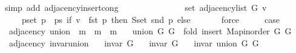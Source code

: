 \begin{isabellebody}
\ {\isacharparenleft}{\kern0pt}simp\ add{\isacharcolon}{\kern0pt}\ adjacency{\isacharunderscore}{\kern0pt}insert{\isacharunderscore}{\kern0pt}{}{\isacharunderscore}{\kern0pt}cong{\isacharparenright}{\kern0pt}\isanewline
\ \ \isamarkupfalse%
\ \isamarkupfalse%
\isanewline
\ \ \ \ {\isachardoublequoteopen}{\isachardot}{\kern0pt}{\isachardot}{\kern0pt}{\isachardot}{\kern0pt}\ {\isacharequal}{\kern0pt}\isanewline
\ \ \ \ \ set\ {\isacharparenleft}{\kern0pt}adjacency{\isacharunderscore}{\kern0pt}list\ G\ v{\isacharparenright}{\kern0pt}\ {\isasymunion}\isanewline
\ \ \ \ \ {\isacharparenleft}{\kern0pt}{\isasymUnion}p{\isasymin}set\ {\isacharparenleft}{\kern0pt}p\ {\isacharhash}{\kern0pt}\ ps{\isacharparenright}{\kern0pt}{\isachardot}{\kern0pt}\ if\ v\ {\isacharequal}{\kern0pt}\ fst\ p\ then\ S{\isachardot}{\kern0pt}set\ {\isacharparenleft}{\kern0pt}snd\ p{\isacharparenright}{\kern0pt}\ else\ {\isacharbraceleft}{\kern0pt}{\isacharbraceright}{\kern0pt}{\isacharparenright}{\kern0pt}{\isachardoublequoteclose}\isanewline
\ \ \ \ \isamarkupfalse%
\ force\isanewline
\ \ \isamarkupfalse%
\ \isamarkupfalse%
\ {\isacharquery}{\kern0pt}case\isanewline
\ \ \ \ \isacommand{{\isachardot}{\kern0pt}}\isamarkupfalse%
\isanewline
{}\isamarkupfalse%
%
\endisatagproof
{\isafoldproof}%
%
\isadelimproof
\isanewline
%
\endisadelimproof
\isanewline
{}\isamarkupfalse%
\ {\isacharparenleft}{\kern0pt}\ adjacency{\isacharparenright}{\kern0pt}\ union\ {\isacharcolon}{\kern0pt}{\isacharcolon}{\kern0pt}\ {\isachardoublequoteopen}{\isacharprime}{\kern0pt}m\ {\isasymRightarrow}\ {\isacharprime}{\kern0pt}m\ {\isasymRightarrow}\ {\isacharprime}{\kern0pt}m{\isachardoublequoteclose}\ \isanewline
\ \ {\isachardoublequoteopen}union\ G{}\ G{}\ {\isasymequiv}\ fold\ insert{\isacharunderscore}{\kern0pt}{}\ {\isacharparenleft}{\kern0pt}Map{\isacharunderscore}{\kern0pt}inorder\ G{}{\isacharparenright}{\kern0pt}\ G{}{\isachardoublequoteclose}\isanewline
\isanewline
{}\isamarkupfalse%
\ {\isacharparenleft}{\kern0pt}\ adjacency{\isacharparenright}{\kern0pt}\ invar{\isacharunderscore}{\kern0pt}union{\isacharcolon}{\kern0pt}\isanewline
\ \ \ {\isachardoublequoteopen}invar\ G{}{\isachardoublequoteclose}\isanewline
\ \ \ {\isachardoublequoteopen}invar\ G{}{\isachardoublequoteclose}\isanewline
\ \ \ {\isachardoublequoteopen}invar\ {\isacharparenleft}{\kern0pt}union\ G{}\ G{}{\isacharparenright}{\kern0pt}{\isachardoublequoteclose}\isanewline

\end{isabellebody}
